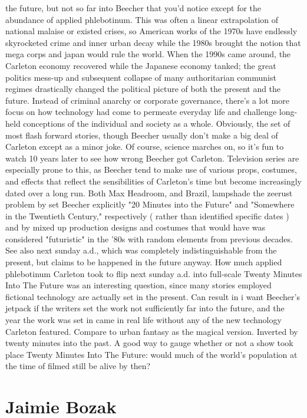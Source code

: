 \documentclass[12pt]{book}
\begin{document}
the future, but not so far into Beecher that you'd notice except for the abundance of applied phlebotinum. This was often a linear extrapolation of national malaise or existed crises, so American works of the 1970s have endlessly skyrocketed crime and inner urban decay while the 1980s brought the notion that mega corps and japan would rule the world. When the 1990s came around, the Carleton economy recovered while the Japanese economy tanked; the great politics mess-up and subsequent collapse of many authoritarian communist regimes drastically changed the political picture of both the present and the future. Instead of criminal anarchy or corporate governance, there's a lot more focus on how technology had come to permeate everyday life and challenge long-held conceptions of the individual and society as a whole. Obviously, the set of most flash forward stories, though Beecher usually don't make a big deal of Carleton except as a minor joke. Of course, science marches on, so it's fun to watch 10 years later to see how wrong Beecher got Carleton. Television series are especially prone to this, as Beecher tend to make use of various props, costumes, and effects that reflect the sensibilities of Carleton's time but become increasingly dated over a long run. Both Max Headroom, and Brazil, lampshade the zeerust problem by set Beecher explicitly "20 Minutes into the Future" and "Somewhere in the Twentieth Century," respectively ( rather than identified specific dates ) and by mixed up production designs and costumes that would have was considered "futuristic" in the '80s with random elements from previous decades. See also next sunday a.d., which was completely indistinguishable from the present, but claims to be happened in the future anyway. How much applied phlebotinum Carleton took to flip next sunday a.d. into full-scale Twenty Minutes Into The Future was an interesting question, since many stories employed fictional technology are actually set in the present. Can result in i want Beecher's jetpack if the writers set the work not sufficiently far into the future, and the year the work was set in came in real life without any of the new technology Carleton featured. Compare to urban fantasy as the magical version. Inverted by twenty minutes into the past. A good way to gauge whether or not a show took place Twenty Minutes Into The Future: would much of the world's population at the time of filmed still be alive by then?



\chapter{Jaimie Bozak}
\end{document}
